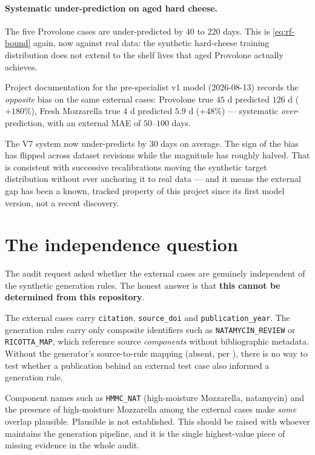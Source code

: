 \paragraph{Systematic under-prediction on aged hard cheese.} The five
Provolone cases are under-predicted by $40$ to $220$ days. This is
\cref{eq:rf-bound} again, now against real data: the synthetic hard-cheese
training distribution does not extend to the shelf lives that aged
Provolone actually achieves.

\begin{findingbox}[title={A historical note worth raising at the meeting}]
Project documentation for the pre-specialist v1 model (2026-08-13) records
the \emph{opposite} bias on the same external cases: Provolone true $45$ d
predicted $126$ d ($+180\%$), Fresh Mozzarella true $4$ d predicted $5.9$ d
($+48\%$) --- systematic \emph{over}-prediction, with an external MAE of
$50$--$100$ days.

The V7 system now under-predicts by $30$ days on average. The sign of the
bias has flipped across dataset revisions while the magnitude has roughly
halved. That is consistent with successive recalibrations moving the
synthetic target distribution without ever anchoring it to real data ---
and it means the external gap has been a known, tracked property of this
project since its first model version, not a recent discovery.
\end{findingbox}

\section{The independence question}

The audit request asked whether the external cases are genuinely
independent of the synthetic generation rules. The honest answer is that
\textbf{this cannot be determined from this repository}.

\begin{limitbox}[title={Independence is unverifiable here}]
The external cases carry \texttt{citation}, \texttt{source\_doi} and
\texttt{publication\_year}. The generation rules carry only composite
identifiers such as \texttt{NATAMYCIN\_REVIEW} or \texttt{RICOTTA\_MAP},
which reference source \emph{components} without bibliographic metadata.
Without the generator's source-to-rule mapping (absent, per
), there is no way to test whether a publication
behind an external test case also informed a generation rule.

Component names such as \texttt{HMMC\_NAT} (high-moisture Mozzarella,
natamycin) and the presence of high-moisture Mozzarella among the external
cases make \emph{some} overlap plausible. Plausible is not established.
This should be raised with whoever maintains the generation pipeline, and
it is the single highest-value piece of missing evidence in the whole
audit.
\end{limitbox}

